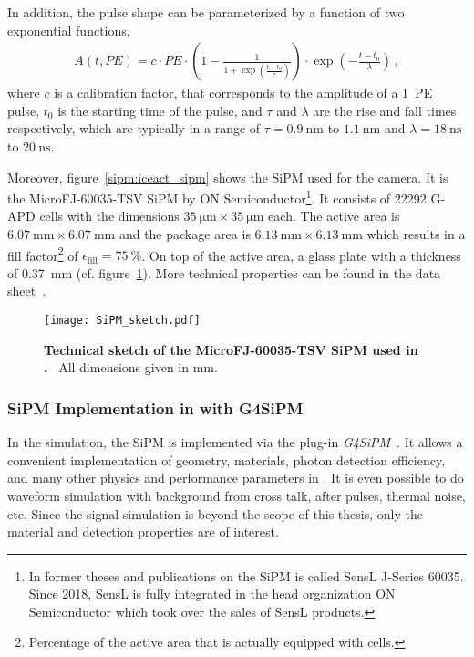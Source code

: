 In addition, the pulse shape can be parameterized by a function of two exponential functions,
\begin{align}
	A(t,PE) = c\cdot PE \cdot \left(1-\frac{1}{1+\exp\left(\frac{t-t_0}{\tau}\right)}\right)\cdot\exp\left(-\frac{t-t_0}{\lambda}\right)\,,
\end{align}
where $c$ is a calibration factor, that corresponds to the amplitude of a \SI{1}{PE} pulse, $t_0$ is the starting time of the pulse, and $\tau$ and $\lambda$ are the rise and fall times respectively, which are typically in a range of $\tau=\SI{0.9}{\nano\meter}$ to $\SI{1.1}{\nano\meter}$ and $\lambda=\SI{18}{\nano\second}$ to $\SI{20}{\nano\second}$.~\cite{sipm:fact_calibration}

Moreover, figure~\ref{sipm:iceact_sipm} shows the SiPM used for the \iceact camera. It is the MicroFJ-60035-TSV SiPM by ON Semiconductor\footnote{In former theses and publications on \iceact the SiPM is called SensL J-Series 60035. Since 2018, SensL is fully integrated in the head organization ON Semiconductor which took over the sales of SensL products.}. 
It consists of \num{22292} G-APD cells with the dimensions $\SI{35}{\micro\meter}\times\SI{35}{\micro\meter}$ each. The active area is $\SI{6.07}{\milli\meter}\times\SI{6.07}{\milli\meter}$ and the package area is $\SI{6.13}{\milli\meter}\times\SI{6.13}{\milli\meter}$ which results in a fill factor\footnote{Percentage of the active area that is actually equipped with cells.} of $\epsilon_\text{fill}=\SI{75}{\percent}$. On top of the active area, a glass plate with a thickness of \SI{0.37}{\milli\meter} (cf. figure~\ref{sipm:tec_sketch}). More technical properties can be found in the data sheet~\cite{sipm:datasheet}.

\begin{figure}[H]
	\centering
	\texttt{[image: SiPM\_sketch.pdf]}
	\caption[Technical sketch of the MicroFJ-60035-TSV SiPM used in \iceact]{\textbf{Technical sketch of the MicroFJ-60035-TSV SiPM used in \iceact.}~\cite{sipm:datasheet} All dimensions given in \si{\milli\meter}.}
	\label{sipm:tec_sketch}	
\end{figure}

\subsubsection{SiPM Implementation in \geant with G4SiPM}

In the \iceact \geant simulation, the SiPM is implemented via the plug-in \textit{G4SiPM}~\cite{sipm:g4sipm}. It allows a convenient implementation of geometry, materials, photon detection efficiency, and many other physics and performance parameters in \geant. It is even possible to do waveform simulation with background from cross talk, after pulses, thermal noise, etc. Since the signal simulation is beyond the scope of this thesis, only the material and detection properties are of interest.\\

